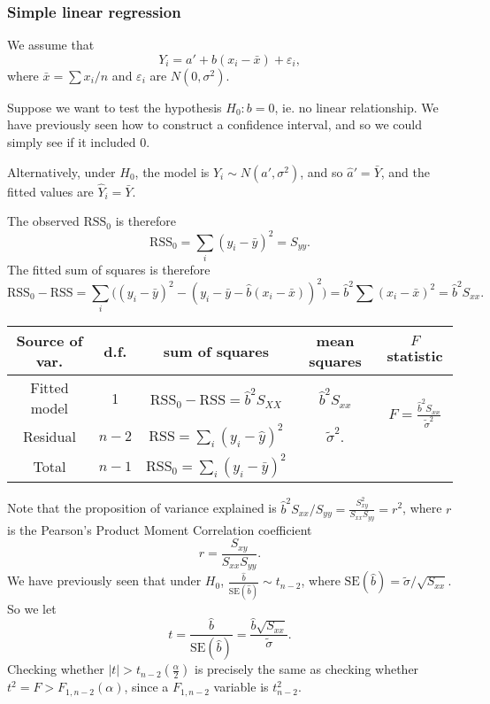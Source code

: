 \documentclass[a4paper]{article}
\begin{document}
\subsubsection{Simple linear regression}
We assume that
\[
  Y_i = a' + b(x_i - \bar x) + \varepsilon_i,
\]
where $\bar x = \sum x_i/n$ and $\varepsilon_i$ are $N(0, \sigma^2)$.

Suppose we want to test the hypothesis $H_0: b = 0$, ie. no linear relationship. We have previously seen how to construct a confidence interval, and so we could simply see if it included 0.

Alternatively, under $H_0$, the model is $Y_i \sim N(a', \sigma^2)$, and so $\hat a' = \bar Y$, and the fitted values are $\hat Y_i = \bar Y$.

The observed $\mathrm{RSS}_0$ is therefore
\[
  \mathrm{RSS}_0 = \sum_i (y_i - \bar y)^2 = S_{yy}.
\]
The fitted sum of squares is therefore
\[
  \mathrm{RSS}_0 - \mathrm{RSS} = \sum_i \big((y_i - \bar y)^2 - (y_i - \bar y - \hat{b}(x_i - \bar x))^2\big) = \hat{b}^2 \sum (x_i - \bar x)^2 = \hat{b}^2 S_{xx}.
\]
\begin{center}
  \begin{tabular}{ccccc}
    \toprule
    Source of var. & d.f. & sum of squares & mean squares & $F$ statistic\\
    \midrule
    Fitted model & 1 & $\mathrm{RSS}_0 - \mathrm{RSS} = \hat{b}^2 S_{XX}$ & $\hat{b}^2 S_{xx}$ & \multirow{2}{*}{$F = \frac{\hat{b}^2 S_{xx}}{\tilde{\sigma}^2}$}\\
    Residual & $n - 2$ & $\mathrm{RSS} = \sum_i (y_i- \hat y)^2$ & $\tilde{\sigma}^2$.\\
    \midrule
    Total & $n - 1$ & $\mathrm{RSS}_0 = \sum_i (y_i - \bar y)^2$\\
    \bottomrule
  \end{tabular}
\end{center}
Note that the proposition of variance explained is $\hat{b}^2S_{xx}/S_{yy} = \frac{S_{xy}^2}{S_{xx}S_{yy}} = r^2$, where $r$ is the Pearson's Product Moment Correlation coefficient
\[
  r = \frac{S_{xy}}{S_{xx}S_{yy}}.
\]
We have previously seen that under $H_0$, $\frac{\hat{b}}{\mathrm{SE}(\hat{b})} \sim t_{n - 2}$, where $\mathrm{SE}(\hat{b}) = \tilde{\sigma}/\sqrt{S_{xx}}$. So we let
\[
  t = \frac{\hat{b}}{\mathrm{SE}(\hat{b})} = \frac{\hat{b}\sqrt{S_{xx}}}{\tilde{\sigma}}.
\]
Checking whether $|t| > t_{n - 2}\left(\frac{\alpha}{2}\right)$ is precisely the same as checking whether $t^2 = F > F_{1, n - 2}(\alpha)$, since a $F_{1, n - 2}$ variable is $t_{n - 2}^2$.
\end{document}
